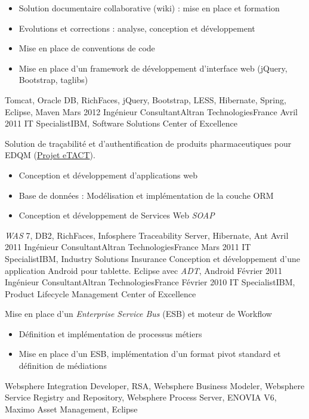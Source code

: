 \begin{experiences}
{\begin{itemize}
      \item Solution documentaire collaborative (wiki) : mise en place et formation
      \item Evolutions et corrections : analyse, conception et développement
      \item Mise en place de conventions de code
      \item Mise en place d'un framework de développement d'interface web (jQuery, Bootstrap, taglibs)
    \end{itemize}
  }
  {Tomcat, Oracle DB, RichFaces, jQuery, Bootstrap, LESS, Hibernate, Spring, Eclipse, Maven}
  \emptySeparator
  \consultantexperience
  {Mars 2012}       {Ingénieur Consultant}{Altran Technologies}{France}
  {Avril 2011}      {IT Specialist}{IBM, Software Solutions Center of Excellence}
  {
    Solution de traçabilité et d'authentification de produits pharmaceutiques pour EDQM (\href{https://www.edqm.eu/fr/eTACT-1466.html}{Projet eTACT}).
    \begin{itemize}
      \item Conception et développement d'applications web
      \item Base de données : Modélisation et implémentation de la couche ORM
      \item Conception et développement de Services Web \emph{SOAP}
    \end{itemize}
  }
  {\emph{WAS} 7, DB2, RichFaces, Infosphere Traceability Server, Hibernate, Ant}
  \emptySeparator
  \consultantexperience
  {Avril 2011}      {Ingénieur Consultant}{Altran Technologies}{France}
  {Mars 2011}       {IT Specialist}{IBM, Industry Solutions Insurance}
  {
    Conception et développement d'une application Android pour tablette.
  }
  {Eclipse avec \emph{ADT}, Android}
  \emptySeparator
  \consultantexperience
  {Février 2011}    {Ingénieur Consultant}{Altran Technologies}{France}
  {Février 2010}    {IT Specialist}{IBM, Product Lifecycle Management Center of Excellence}
  {
    Mise en place d'un \emph{Enterprise Service Bus} (ESB) et moteur de Workflow
    \begin{itemize}
      \item Définition et implémentation de processus métiers
      \item Mise en place d'un ESB, implémentation d'un format pivot standard et définition de médiations
    \end{itemize}
  }
  {
    Websphere Integration Developer, RSA, Websphere Business Modeler, Websphere Service Registry and Repository,
    Websphere Process Server, ENOVIA V6, Maximo Asset Management, Eclipse
}
\end{experiences}
